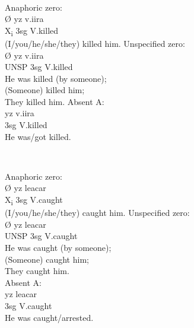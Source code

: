 \documentclass[output=collectionpaper]{langsci/langscibook}
\begin{document}
\ea
\label{ex:Nich:21}
\footnotemark{} \\
\begin{xlist}
\ex
Anaphoric zero:	\\
\gll Ø 	yz  	v.iira\\
X\textsubscript{i}	3sg	V.killed\\
\glt (I/you/he/she/they) killed him.
\ex
Unspecified zero:\\
\gll Ø	 yz	v.iira\\
UNSP	3sg	V.killed\\
\glt He was killed (by someone);\\
(Someone) killed him;\\
They killed him.
\ex
Absent A:	\\
\gll yz   	v.iira\\
3sg	V.killed\\
\glt He was/got killed.\\
\end{xlist}
\z
{}

\ea
\label{ex:Nich:22}
 \\
\begin{xlist}
\ex
Anaphoric zero:\\
\gll	Ø	yz  	leacar\\
X\textsubscript{i}	3sg	V.caught \\
\glt (I/you/he/she/they) caught him.
\ex
Unspecified zero: \\
\gll Ø	 yz	leacar\\
UNSP	3sg	V.caught\\
\glt	He was caught (by someone);\\
(Someone) caught him;\\
They caught him.\\
\ex
Absent A:\\
\gll yz   	leacar\\
3sg	V.caught \\
\glt He was caught/arrested.
\end{xlist}
\z
\end{document}
